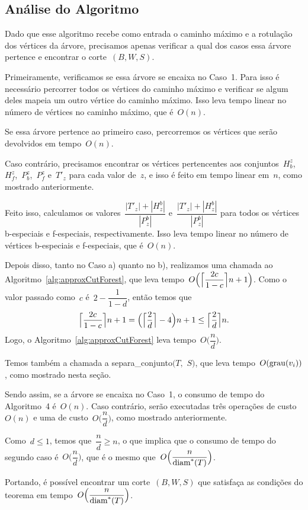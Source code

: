 	\subsection*{Análise do Algoritmo}
	Dado que esse algoritmo recebe como entrada
	o caminho máximo e a rotulação dos vértices
	da árvore, precisamos apenas verificar a qual dos casos essa árvore
	pertence e encontrar o corte~$(B,W,S)$.

	Primeiramente, verificamos se essa árvore se encaixa no Caso~1.
	Para isso é necessário percorrer todos os vértices do caminho máximo
	e verificar se algum deles mapeia um outro vértice do caminho máximo.
	Isso leva tempo linear no número de vértices no caminho máximo, que
	é~$O(n)$.

	Se essa árvore pertence ao primeiro caso, percorremos os vértices que
	serão devolvidos em tempo~$O(n)$.

	Caso contrário, precisamos encontrar os vértices pertencentes aos 
	conjuntos~$H_b^z$,~$H_f^z$,~$P_b^z$,~$P_f^z$ e~$T'_z$
	para cada valor de~$z$,
	e isso é feito em tempo linear em~$n$, como mostrado anteriormente.


	Feito isso, calculamos os 
	valores~${\dfrac{|T'_{z}|+|H_{z}^b|}{|P^b_{z}|}}$
	e~${\dfrac{|T'_{z}|+|H_{z}^b|}{|P^b_{z}|}}$
	para todos os vértices b-especiais e f-especiais, respectivamente.
	Isso leva tempo linear no número de vértices b-especiais e f-especiais,
	que é~$O(n)$.

	Depois disso, tanto no Caso a) quanto no b), realizamos uma chamada ao 
	Algoritmo~\ref{alg:approxCutForest}, que leva 
	tempo~$O\Big(\ceil[\Big]{ \dfrac{2c}{1-c}} n+1\Big)$.
	Como o valor passado como~$c$ é~$2-\dfrac{1}{1-d}$, então
	temos que
	$$ \ceil[\Big]{\dfrac{2c}{1-c}} n+1 
	= \Big(\ceil[\Big]{\dfrac{2}{d}}-4 \Big)n+1 
	\le \ceil[\Big]{\dfrac{2}{d}}n.$$ 
	Logo, o
	Algoritmo~\ref{alg:approxCutForest} leva tempo~$O\Big(\dfrac{n}{d}\Big)$.

	Temos também a chamada a {\sc separa\_conjunto}$(T,$ $S)$, que 
	leva tempo~$O(\grau(v_i))$, como mostrado nesta seção.
	
	Sendo assim, se a árvore se encaixa no Caso~1,
	o consumo de tempo do Algoritmo~4 é~$O(n)$.
	Caso contrário, serão executadas três operações de custo~$O(n)$
	e uma de custo~$O\Big(\dfrac{n}{d}\Big)$, como mostrado anteriormente. 
	
	Como~$d\le1$, temos que~$\dfrac{n}{d}\ge n$, o que implica que o
	consumo de tempo do segundo caso é~$O\Big(\dfrac{n}{d}\Big)$, que 
	é o mesmo que~$O\Big(\dfrac{n}{\diam^*(T)}\Big)$.

	Portando, é possível encontrar um corte~$(B,W,S)$
	que satisfaça as condições do teorema em 
	tempo~$O\Big(\dfrac{n}{\diam^*(T)}\Big)$.
